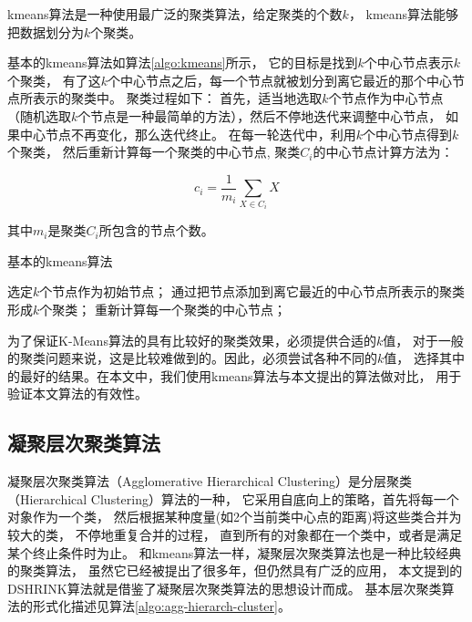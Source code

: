kmeans算法是一种使用最广泛的聚类算法，给定聚类的个数$k$，
kmeans算法能够把数据划分为$k$个聚类。

基本的kmeans算法如算法\ref{algo:kmeans}所示，
它的目标是找到$k$个中心节点表示$k$个聚类，
有了这$k$个中心节点之后，每一个节点就被划分到离它最近的那个中心节点所表示的聚类中。
聚类过程如下：
首先，适当地选取$k$个节点作为中心节点（随机选取$k$个节点是一种最简单的方法），然后不停地迭代来调整中心节点，
如果中心节点不再变化，那么迭代终止。
在每一轮迭代中，利用$k$个中心节点得到$k$个聚类，
然后重新计算每一个聚类的中心节点, 聚类$C_i$的中心节点计算方法为：

\begin{equation}
    c_i = \frac{1}{m_i} \sum_{X \in C_i} X
\end{equation}

其中$m_i$是聚类$C_i$所包含的节点个数。

\begin{algorithm}[htb]
    \caption{基本的kmeans算法}
    \label{algo:kmeans}
    \begin{algorithmic}[1]
        \State 选定$k$个节点作为初始节点；
        \Repeat
            \State 通过把节点添加到离它最近的中心节点所表示的聚类形成$k$个聚类；
            \State 重新计算每一个聚类的中心节点；
    \end{algorithmic}
\end{algorithm}

为了保证K-Means算法的具有比较好的聚类效果，必须提供合适的$k$值，
对于一般的聚类问题来说，这是比较难做到的。因此，必须尝试各种不同的$k$值，
选择其中的最好的结果。在本文中，我们使用kmeans算法与本文提出的算法做对比，
用于验证本文算法的有效性。

\subsection{凝聚层次聚类算法}

凝聚层次聚类算法（Agglomerative Hierarchical Clustering）是分层聚类（Hierarchical Clustering）算法的一种，
它采用自底向上的策略，首先将每一个对象作为一个类，
然后根据某种度量(如2个当前类中心点的距离)将这些类合并为较大的类，
不停地重复合并的过程，
直到所有的对象都在一个类中，或者是满足某个终止条件时为止。
和kmeans算法一样，凝聚层次聚类算法也是一种比较经典的聚类算法，
虽然它已经被提出了很多年，但仍然具有广泛的应用，
本文提到的DSHRINK算法就是借鉴了凝聚层次聚类算法的思想设计而成。
基本层次聚类算法的形式化描述见算法\ref{algo:agg-hierarch-cluster}。

